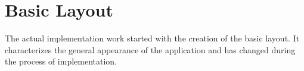 %
\newpage
\section{Basic Layout}
	\label{sec:basiclayout}
The actual implementation work started with the creation of the basic layout. It characterizes the general appearance of the application and has changed during the process of implementation.

